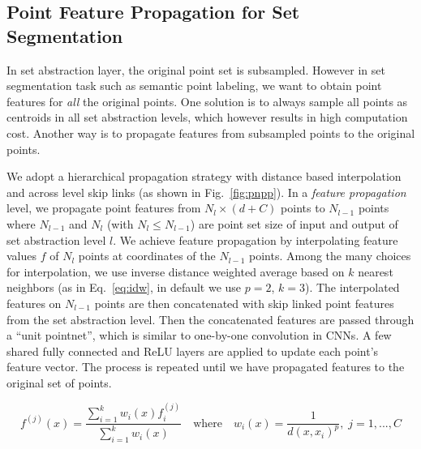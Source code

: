 
\vspace{-0.3cm}
\subsection{Point Feature Propagation for Set Segmentation}
In set abstraction layer, the original point set is subsampled. However in set segmentation task such as semantic point labeling, we want to obtain point features for \emph{all} the original points. One solution is to always sample all points as centroids in all set abstraction levels, which however results in high computation cost. Another way is to propagate features from subsampled points to the original points.

We adopt a hierarchical propagation strategy with distance based interpolation and across level skip links (as shown in Fig.~\ref{fig:pnpp}). In a \emph{feature propagation} level, we propagate point features from $N_l \times (d+C)$ points to $N_{l-1}$ points where $N_{l-1}$ and $N_l$ (with $N_l \leq N_{l-1}$) are point set size of input and output of set abstraction level $l$. We achieve feature propagation by interpolating feature values $f$ of $N_{l}$ points at coordinates of the $N_{l-1}$ points. Among the many choices for interpolation, we use inverse distance weighted average based on $k$ nearest neighbors (as in Eq.~\ref{eq:idw}, in default we use $p=2$, $k=3$). The interpolated features on $N_{l-1}$ points are then concatenated with skip linked point features from the set abstraction level. Then the concatenated features are passed through a ``unit pointnet'', which is similar to one-by-one convolution in CNNs. A few shared fully connected and ReLU layers are applied to update each point's feature vector. The process is repeated until we have propagated features to the original set of points.

\vspace{-0.3cm}
\begin{equation}
    f^{(j)}(x) = \frac{\sum_{i=1}^{k}w_i (x) f_i^{(j)}}{\sum_{i=1}^k w_i (x)}
    \quad \text{where}\quad w_i(x) = \frac{1}{d(x,x_i)^p},\; j=1,...,C
    \label{eq:idw}
\end{equation}